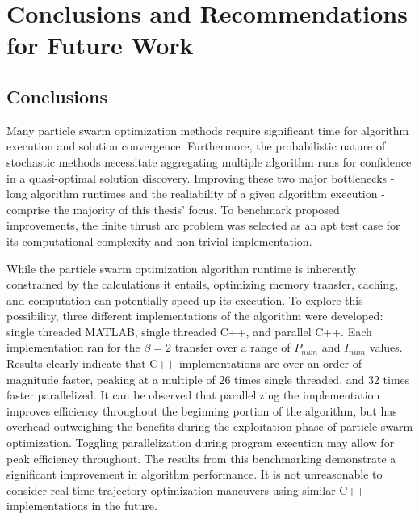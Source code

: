 \chapter{Conclusions and Recommendations for Future Work}

\section{Conclusions}
\noindent
Many particle swarm optimization methods
require significant time for algorithm execution and solution convergence. Furthermore, the probabilistic nature of stochastic methods necessitate aggregating multiple
algorithm runs for confidence in a quasi-optimal solution discovery. Improving these two major bottlenecks - long algorithm
runtimes and the realiability of a given algorithm execution - comprise the majority of this thesis' focus. 
To benchmark proposed improvements, the finite thrust arc problem was selected as an apt test case
for its computational complexity and non-trivial implementation. \newline

\noindent While the particle swarm optimization algorithm runtime is inherently constrained by the 
calculations it entails, optimizing memory transfer, caching, and computation can potentially speed up its
execution. To explore this possibility, three different implementations of the algorithm were developed:
single threaded MATLAB, single threaded C++, and parallel C++. Each implementation ran for the $\beta = 2$
transfer over a range of $P_{num}$ and $I_{num}$ values. Results clearly indicate that C++ implementations 
are over an order of magnitude faster, peaking at a multiple of 26 times single threaded, and 32 times faster
parallelized. It can be observed that parallelizing the implementation improves efficiency throughout the
beginning portion of the algorithm, but has overhead outweighing the benefits during the exploitation phase of
particle swarm optimization. Toggling parallelization during program execution may allow for peak
efficiency throughout. The results from this benchmarking demonstrate a significant improvement in 
algorithm performance. It is not unreasonable to consider real-time trajectory optimization maneuvers using 
similar C++ implementations in the future. \newline

